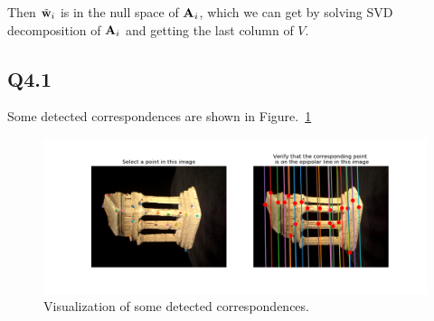 \documentclass[11pt]{article}
\begin{document}
Then $\tilde{\mathbf{w}}_i$ is in the null space of $\mathbf{A}_i$, which we can get by solving SVD decomposition of $\mathbf{A}_i$ and getting the last column of $V$.

%
%

\newpage

\subsection*{Q4.1}

Some detected correspondences are shown in Figure.~\ref{fig:q4.1}

\begin{figure}[h!]
    \centering
    \includegraphics[width=.8\linewidth]{../results/q4_1.png}
    \caption{Visualization of some detected correspondences. }
    \label{fig:q4.1}
\end{figure}
\end{document}
